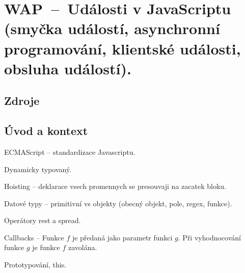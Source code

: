 

\graphicspath{{wap/udalosti_v_javascriptu/figures}}


\chapter{WAP~--~Události v JavaScriptu (smyčka událostí, asynchronní programování, klientské události, obsluha událostí).}


\section{Zdroje}

\begin{compactitem}
    \item {}
    \item {}
    \item {}
    \item {}
\end{compactitem}


\section{Úvod a kontext}

\begin{compactitem}
    \item ECMAScript -- standardizace Javascriptu.
    \item Dynamicky typovaný.
    \item Hoisting -- deklarace vsech promennych se presouvaji na zacatek bloku.
    \item Datové typy -- primitivní vs objekty (obecný objekt, pole, regex, funkce).
    \item Operátory rest a spread.
    \item Callbacks -- Funkce $f$ je předaná jako parametr funkci $g$. Při vyhodnocování funkce $g$ je funkce $f$ zavolána.
    \item Prototypování, this.
\end{compactitem}

